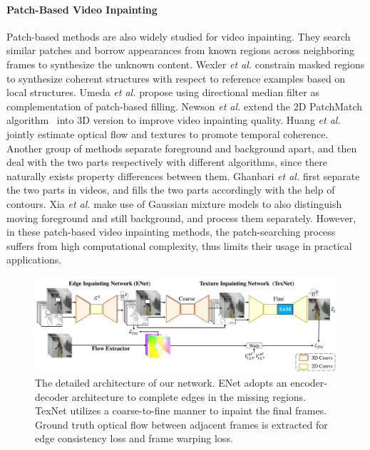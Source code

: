 \paragraph{Patch-Based Video Inpainting} Patch-based methods are also widely studied for video inpainting. 
They search similar patches and borrow appearances from known regions across neighboring frames to synthesize the unknown content. 
Wexler \emph{et al.} \cite{wexler2007space} constrain masked regions to synthesize coherent structures with respect to reference examples based on local structures. 
Umeda \emph{et al.} \cite{umeda2012removal} propose using directional median filter as complementation of patch-based filling.
Newson \emph{et al.} \cite{newson2014video} extend the 2D PatchMatch algorithm~\cite{barnes2009patchmatch} into 3D version to improve video inpainting quality.
Huang \emph{et al.} \cite{huang2016temporally} jointly estimate optical flow and textures to promote temporal coherence.
%
Another group of methods separate foreground and background apart, and then deal with the two parts respectively with different algorithms, since there naturally exists property differences between them.  
Ghanbari \emph{et al.} \cite{ghanbari2011contour} first separate the two parts in videos, and fills the two parts accordingly with the help of contours.
Xia \emph{et al.} \cite{xia2011exemplar} make use of Gaussian mixture models to also distinguish moving foreground and still background, and process them separately.   
However, in these patch-based video inpainting methods, the patch-searching process suffers from high computational complexity, thus limits their usage in practical applications.



\begin{figure}[!t]
	\centering
	\includegraphics[width=2.05\columnwidth]{sti} %
	\caption{The detailed architecture of our network. ENet adopts an encoder-decoder architecture to complete edges in the missing regions. TexNet utilizes a coarse-to-fine manner to inpaint the final frames. Ground truth optical flow between adjacent frames is extracted for edge consistency loss and frame warping loss. }
	\label{fig:stiNet}
\end{figure}

